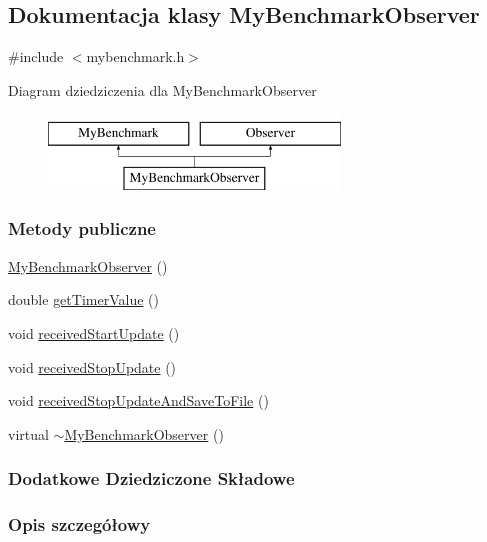 \hypertarget{class_my_benchmark_observer}{\subsection{Dokumentacja klasy My\-Benchmark\-Observer}
\label{class_my_benchmark_observer}
}


{\ttfamily \#include $<$mybenchmark.\-h$>$}

Diagram dziedziczenia dla My\-Benchmark\-Observer\begin{figure}[H]
\begin{center}
\leavevmode
\includegraphics[height=2.000000cm]{class_my_benchmark_observer}
\end{center}
\end{figure}
\subsubsection*{Metody publiczne}
\begin{DoxyCompactItemize}
\item 
\hyperlink{class_my_benchmark_observer_ad65d0afb1ea49dbdebd1aef5f374aa9a}{My\-Benchmark\-Observer} ()
\item 
double \hyperlink{class_my_benchmark_observer_a33ea57a2d321f835f3af0d3bab76a931}{get\-Timer\-Value} ()
\item 
void \hyperlink{class_my_benchmark_observer_a50a758f459b683b82bbb32fa4c2f13df}{received\-Start\-Update} ()
\item 
void \hyperlink{class_my_benchmark_observer_aaf6a636ef6e8d8f8f8bc6d540e432246}{received\-Stop\-Update} ()
\item 
void \hyperlink{class_my_benchmark_observer_a2c12408a0f213a39d3419fd807f30968}{received\-Stop\-Update\-And\-Save\-To\-File} ()
\item 
virtual \hyperlink{class_my_benchmark_observer_addcc70a6c10af608874dc8613c84299f}{$\sim$\-My\-Benchmark\-Observer} ()
\end{DoxyCompactItemize}
\subsubsection*{Dodatkowe Dziedziczone Składowe}


\subsubsection{Opis szczegółowy}


